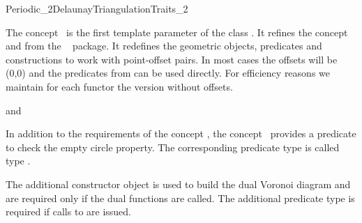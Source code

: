 

\begin{ccRefConcept}{Periodic_2DelaunayTriangulationTraits_2}

\ccDefinition
%
The concept \ccRefName\ is the first template parameter of the class
. It refines the concept
 and
 from the \cgal\  package.  It redefines the
geometric objects, predicates and constructions to work with
point-offset pairs. In most cases the offsets will be (0,0) and the
predicates from  can be used
directly. For efficiency reasons we maintain for each functor the
version without offsets.

\ccRefines
%
 and 

In addition to the requirements of the concept
, the concept \ccRefName\
provides a predicate to check the empty circle property. The
corresponding predicate type is called type
.

The additional constructor object  is
used to build the dual Voronoi diagram and are required only if the
dual functions are called.  The additional predicate type
 is required if calls to
 are issued.


\ccTypes
%
%


\end{ccRefConcept}
